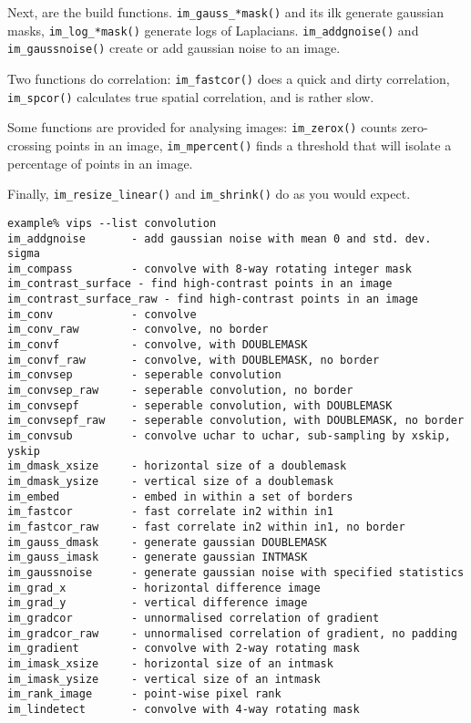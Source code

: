 Next, are the build functions. \verb+im_gauss_*mask()+ and its ilk
generate gaussian masks, \verb+im_log_*mask()+ generate logs of Laplacians.
\verb+im_addgnoise()+ and \verb+im_gaussnoise()+ create or add gaussian
noise to an image.

Two functions do correlation: \verb+im_fastcor()+ does a quick and dirty
correlation, \verb+im_spcor()+ calculates true spatial correlation, and is
rather slow.

Some functions are provided for analysing images: \verb+im_zerox()+ counts
zero-crossing points in an image, \verb+im_mpercent()+ finds a threshold
that will isolate a percentage of points in an image.

Finally, \verb+im_resize_linear()+ and \verb+im_shrink()+ do as you would
expect.

\begin{fig2}
\begin{verbatim}
example% vips --list convolution
im_addgnoise       - add gaussian noise with mean 0 and std. dev. sigma
im_compass         - convolve with 8-way rotating integer mask
im_contrast_surface - find high-contrast points in an image
im_contrast_surface_raw - find high-contrast points in an image
im_conv            - convolve
im_conv_raw        - convolve, no border
im_convf           - convolve, with DOUBLEMASK
im_convf_raw       - convolve, with DOUBLEMASK, no border
im_convsep         - seperable convolution
im_convsep_raw     - seperable convolution, no border
im_convsepf        - seperable convolution, with DOUBLEMASK
im_convsepf_raw    - seperable convolution, with DOUBLEMASK, no border
im_convsub         - convolve uchar to uchar, sub-sampling by xskip, yskip
im_dmask_xsize     - horizontal size of a doublemask
im_dmask_ysize     - vertical size of a doublemask
im_embed           - embed in within a set of borders
im_fastcor         - fast correlate in2 within in1
im_fastcor_raw     - fast correlate in2 within in1, no border
im_gauss_dmask     - generate gaussian DOUBLEMASK
im_gauss_imask     - generate gaussian INTMASK
im_gaussnoise      - generate gaussian noise with specified statistics
im_grad_x          - horizontal difference image
im_grad_y          - vertical difference image
im_gradcor         - unnormalised correlation of gradient 
im_gradcor_raw     - unnormalised correlation of gradient, no padding
im_gradient        - convolve with 2-way rotating mask
im_imask_xsize     - horizontal size of an intmask
im_imask_ysize     - vertical size of an intmask
im_rank_image      - point-wise pixel rank
im_lindetect       - convolve with 4-way rotating mask

\end{verbatim}
\end{fig2}

